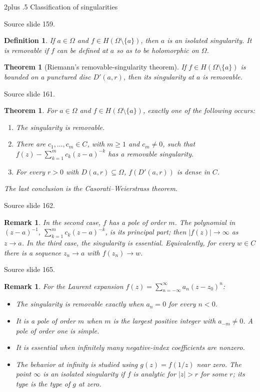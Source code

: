 \documentclass[10pt,letterpaper,twoside,openright]{amsbook}
\makeatletter
\numberwithin{equation}{subsection}
\renewcommand{\section}{\@startsection{section}{1}
 {\z@}{2\baselineskip plus .5\baselineskip}
 {\baselineskip}{\normalfont\Large\bfseries\centering}}
\theoremstyle{sea-plain}
\newtheorem{theorem}[subsection]{Theorem}
\theoremstyle{sea-definition}
\newtheorem{definition}[subsection]{Definition}
\newtheorem{remark}[subsection]{Remark}
\theoremstyle{sea-exercise}
\newcommand{\RR}{\mathbb{R}}
\newcommand{\CC}{\mathbb{C}}
\newcommand{\DD}{\mathbb{D}}
\newcommand{\HH}{\mathbb{H}}
\newcommand{\Chat}{\mathbb{C}_{\infty}}
\def\CC{C}\def\RR{R}\def\DD{D}\def\HH{H}\def\Chat{C infinity}}
\newcommand{\src}[1]{\par\smallskip\noindent
 {\scriptsize\sffamily\color{SoftWhite}Source slide #1.}\par\nopagebreak\smallskip}
\makeatother
\begin{document}
\section{Classification of singularities}
\src{159}
\begin{definition}
If $a\in\Omega$ and $f\in H(\Omega\setminus\{a\})$, then $a$ is an
\emph{isolated singularity}. It is \emph{removable} if $f$ can be
defined at $a$ so as to be holomorphic on $\Omega$.
\end{definition}
\begin{theorem}[Riemann's removable-singularity theorem]
If $f\in H(\Omega\setminus\{a\})$ is bounded on a punctured disc
$D'(a,r)$, then its singularity at $a$ is removable.
\end{theorem}
\src{161}
\begin{theorem}
For $a\in\Omega$ and $f\in H(\Omega\setminus\{a\})$, exactly one of
the following occurs:
\begin{enumerate}
\item The singularity is removable.
\item There are $c_1,\ldots,c_m\in\CC$, with $m\ge1$ and $c_m\ne0$,
such that $f(z)-\sum_{k=1}^m c_k(z-a)^{-k}$ has a removable singularity.
\item For every $r>0$ with $D(a,r)\subseteq\Omega$,
$f(D'(a,r))$ is dense in $\CC$.
\end{enumerate}
The last conclusion is the Casorati--Weierstrass theorem.
\end{theorem}
\src{162}
\begin{remark}
In the second case, $f$ has a \emph{pole of order $m$}.
The polynomial in $(z-a)^{-1}$, $\sum_{k=1}^m c_k(z-a)^{-k}$,
is its \emph{principal part}; then $|f(z)|\to\infty$ as $z\to a$.
In the third case, the singularity is \emph{essential}.
Equivalently, for every $w\in\CC$ there is a sequence
$z_n\to a$ with $f(z_n)\to w$.
\end{remark}
\src{165}
\begin{remark}
For the Laurent expansion $f(z)=\sum_{n=-\infty}^\infty a_n(z-z_0)^n$:
\begin{itemize}
\item The singularity is removable exactly when $a_n=0$ for every $n<0$.
\item It is a pole of order $m$ when $m$ is the largest positive
integer with $a_{-m}\ne0$. A pole of order one is \emph{simple}.
\item It is essential when infinitely many negative-index coefficients
are nonzero.
\item The behavior at infinity is studied using $g(z)=f(1/z)$ near zero.
The point $\infty$ is an isolated singularity if $f$ is analytic for
$|z|>r$ for some $r$; its type is the type of $g$ at zero.
\end{itemize}
\end{remark}
\end{document}
